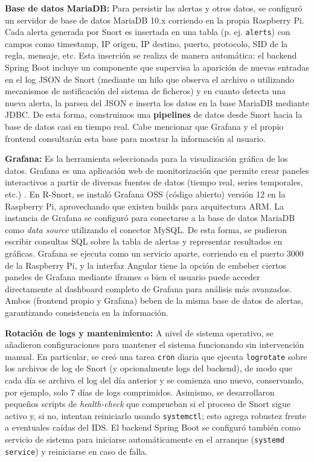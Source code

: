 \documentclass[11pt,a4paper,twoside]{report}
\begin{document}
\textbf{Base de datos MariaDB:} Para persistir las alertas y otros datos, se configuró un servidor de base de datos MariaDB 10.x corriendo en la propia Raspberry Pi. Cada alerta generada por Snort es insertada en una tabla (p. ej. \texttt{alerts}) con campos como timestamp, IP origen, IP destino, puerto, protocolo, SID de la regla, mensaje, etc. Esta inserción se realiza de manera automática: el backend Spring Boot incluye un componente que supervisa la aparición de nuevas entradas en el log JSON de Snort (mediante un hilo que observa el archivo o utilizando mecanismos de notificación del sistema de ficheros) y en cuanto detecta una nueva alerta, la parsea del JSON e inserta los datos en la base MariaDB mediante JDBC. De esta forma, construimos una \textbf{pipelines} de datos desde Snort hacia la base de datos casi en tiempo real. Cabe mencionar que Grafana y el propio frontend consultarán esta base para mostrar la información al usuario.\newline

\textbf{Grafana:} Es la herramienta seleccionada para la visualización gráfica de los datos. Grafana es una aplicación web de monitorización que permite crear paneles interactivos a partir de diversas fuentes de datos (tiempo real, series temporales, etc.) \cite{Grafana}. En R-Snort, se instaló Grafana OSS (código abierto) versión 12 en la Raspberry Pi, aprovechando que existen builds para arquitectura ARM. La instancia de Grafana se configuró para conectarse a la base de datos MariaDB como \emph{data source} utilizando el conector MySQL. De esta forma, se pudieron escribir consultas SQL sobre la tabla de alertas y representar resultados en gráficas. Grafana se ejecuta como un servicio aparte, corriendo en el puerto 3000 de la Raspberry Pi, y la interfaz Angular tiene la opción de embeber ciertos paneles de Grafana mediante iframes o bien el usuario puede acceder directamente al dashboard completo de Grafana para análisis más avanzados. Ambos (frontend propio y Grafana) beben de la misma base de datos de alertas, garantizando consistencia en la información.\newline

\textbf{Rotación de logs y mantenimiento:} A nivel de sistema operativo, se añadieron configuraciones para mantener el sistema funcionando sin intervención manual. En particular, se creó una tarea \texttt{cron} diaria que ejecuta \texttt{logrotate} sobre los archivos de log de Snort (y opcionalmente logs del backend), de modo que cada día se archiva el log del día anterior y se comienza uno nuevo, conservando, por ejemplo, solo 7 días de logs comprimidos. Asimismo, se desarrollaron pequeños scripts de \emph{health-check} que comprueban si el proceso de Snort sigue activo y, si no, intentan reiniciarlo usando \texttt{systemctl}; esto agrega robustez frente a eventuales caídas del IDS. El backend Spring Boot se configuró también como servicio de sistema para iniciarse automáticamente en el arranque (\texttt{systemd service}) y reiniciarse en caso de falla.\newline
\end{document}
